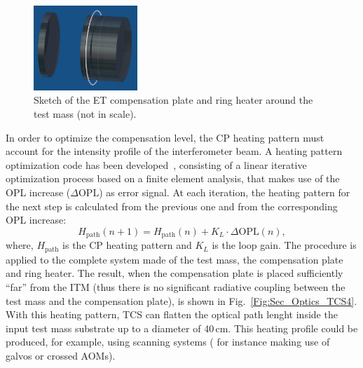 \begin{figure}[!h]
\centering
\includegraphics[width=0.35\textwidth]{Sec_Optics/TCS_3.png}
\caption{Sketch of the ET compensation plate and ring heater around the test mass (not in scale).}
\label{Fig:Sec_Optics_TCS3}   
\end{figure}



In order to optimize the compensation level, the CP heating pattern must  account for the intensity profile of the interferometer beam. 
A heating pattern optimization code has been developed~\cite{rocchi10}, consisting of a linear iterative optimization process based on a finite element 
analysis,
that makes use of the OPL increase ($\Delta \text{OPL}$) as error signal. At each iteration, the heating 
 pattern for the next step is calculated from the previous one and from the corresponding OPL increase:
\begin{equation}
H_{\text{path}}(n+1)=H_{\text{path}}(n)+K_L \cdot  \Delta \text{OPL}(n),
\end{equation}
where, $H_{\text{path}}$ is the CP heating pattern and $K_L$ is the loop gain. The procedure is applied 
to the complete system made of the test mass, the compensation plate and ring heater.
The result, when the compensation plate is placed sufficiently ``far'' from the ITM (thus there is no significant
radiative coupling between the test mass and the compensation plate), is shown in Fig.~\ref{Fig:Sec_Optics_TCS4}. With this 
heating pattern, TCS can flatten the optical path lenght inside the input test mass substrate up to a diameter 
of 40\,cm. This heating profile could be produced, for example, using scanning systems ( for instance making  use of  galvos
 or crossed AOMs).%

